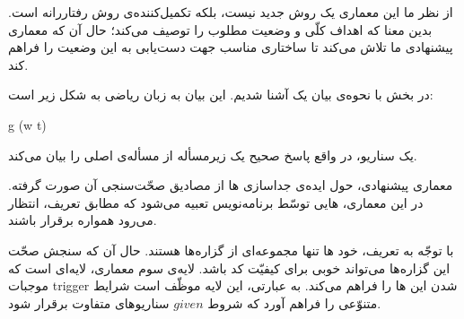 از نظر ما این معماری یک روش جدید نیست، بلکه تکمیل‌کننده‌ی روش رفتاررانه است. بدین معنا که  اهداف کلّی و وضعیت مطلوب را توصیف می‌کند؛ حال آن که معماری پیشنهادی ما تلاش می‌کند تا ساختاری مناسب جهت دست‌یابی به این وضعیت را فراهم کند.

در بخش  با نحوه‌ی بیان یک  آشنا شدیم. این بیان به زبان ریاضی به شکل زیر است:

g \implies (w \implies t)


یک سناریو، در واقع پاسخ صحیح یک زیرمسأله از مسأله‌ی اصلی را بیان می‌کند.

معماری پیشنهادی، حول ایده‌ی جداسازی ها از مصادیق صحّت‌سنجی آن صورت گرفته. در این معماری، هایی توسّط برنامه‌نویس تعبیه می‌شود که مطابق تعریف، انتظار می‌رود همواره برقرار باشند.

با توجّه به تعریف، خود ها تنها مجموعه‌ای از گزاره‌ها هستند. حال آن که سنجش صحّت این گزاره‌ها می‌تواند  خوبی برای کیفیّت کد باشد. لایه‌ی سوم معماری، لایه‌ای است که موجبات trigger شدن این ها را فراهم می‌کند. به عبارتی، این لایه موظّف است شرایط متنوّعی را فراهم آورد که شروط $given$ سناریوهای متفاوت برقرار شود.


